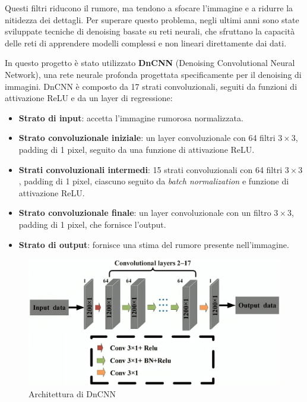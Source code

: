 Questi filtri riducono il rumore, ma tendono a sfocare l'immagine e a ridurre la nitidezza dei dettagli. Per superare questo problema, negli ultimi anni sono state sviluppate tecniche di denoising basate su reti neurali, che sfruttano la capacità delle reti di apprendere modelli complessi e non lineari direttamente dai dati.

In questo progetto è stato utilizzato \textbf{DnCNN} (Denoising Convolutional Neural Network), una rete neurale profonda progettata specificamente per il denoising di immagini. DnCNN è composto da 17 strati convoluzionali, seguiti da funzioni di attivazione ReLU e da un layer di regressione:

\begin{itemize}
    \item \textbf{Strato di input}: accetta l'immagine rumorosa normalizzata.
    \item \textbf{Strato convoluzionale iniziale}: un layer convoluzionale con 64 filtri $3 \times 3$, padding di 1 pixel, seguito da una funzione di attivazione ReLU. \item \textbf{Strati convoluzionali intermedi}: 15 strati convoluzionali con 64 filtri $3 \times 3$, padding di 1 pixel, ciascuno seguito da \textit{batch normalization} e funzione di attivazione ReLU. \item \textbf{Strato convoluzionale finale}: un layer convoluzionale con un filtro $3 \times 3$, padding di 1 pixel, che fornisce l'output. 
    \item \textbf{Strato di output}: fornisce una stima del rumore presente nell'immagine.
\end{itemize}

\begin{figure}[H]
    \centering
    \includegraphics[scale=0.3]{../assets/dncnn.png}
    \captionsetup{justification=centering}
    \caption{Architettura di DnCNN \cite{dncnn_img}} \label{fig:dncnn}
\end{figure}

